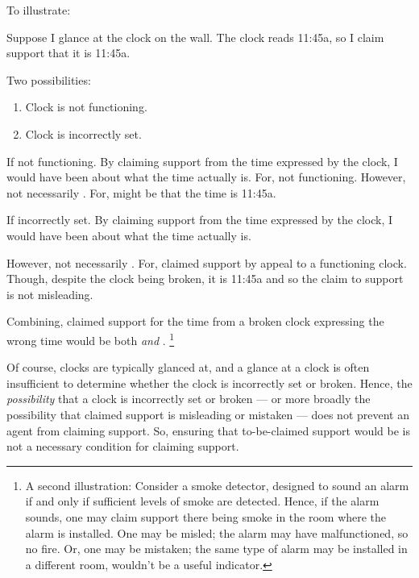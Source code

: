 \begin{note}[M\&M Illustration]
  To illustrate:

  \begin{illustration}[Clock]
    Suppose I glance at the clock on the wall. The clock reads 11:45a, so I claim support that it is 11:45a.
  \end{illustration}

  Two possibilities:
  \begin{enumerate}
  \item Clock is not functioning.
  \item Clock is incorrectly set.
  \end{enumerate}

  If not functioning.
  By claiming support from the time expressed by the clock, I would have been \emph{\misled{}} about what the time actually is.
  For, not functioning.
  However, not necessarily \mistaken{}.
  For, might be that the time is 11:45a.

  If incorrectly set.
  By claiming support from the time expressed by the clock, I would have been \emph{\mistaken{}} about what the time actually is.

  However, not necessarily \misled{}.
  For, claimed support by appeal to a functioning clock.
  Though, despite the clock being broken, it is 11:45a and so the claim to support is not misleading.

  Combining, claimed support for the time from a broken clock expressing the wrong time would be both \misled{} \emph{and} \mistaken{}.\nolinebreak
  \footnote{
    A second illustration:
    Consider a smoke detector, designed to sound an alarm if and only if sufficient levels of smoke are detected.
    Hence, if the alarm sounds, one may claim support there being smoke in the room where the alarm is installed.
    One may be misled; the alarm may have malfunctioned, so no fire.
    Or, one may be mistaken; the same type of alarm may be installed in a different room, wouldn't be a useful indicator.
  }

  {
    \color{red}
    Of course, clocks are typically glanced at, and a glance at a clock is often insufficient to determine whether the clock is incorrectly set or broken.
    Hence, the \emph{possibility} that a clock is incorrectly set or broken --- or more broadly the possibility that claimed support is misleading or mistaken --- does not prevent an agent from claiming support.
    So, ensuring that to-be-claimed support would be \mom{} is not a necessary condition for claiming support.
  }
\end{note}

